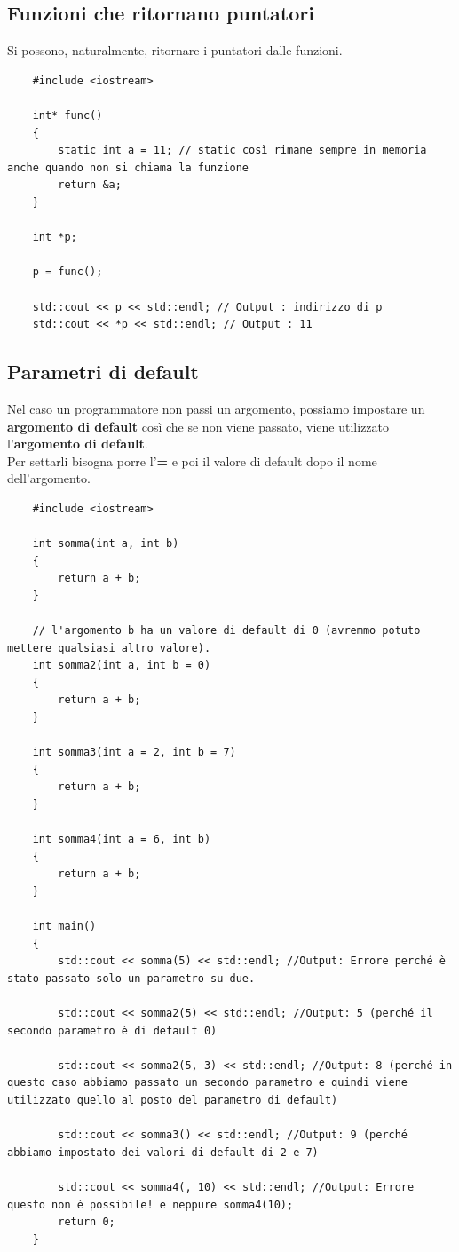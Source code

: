 \subsection{Funzioni che ritornano puntatori}

\textsf{\small Si possono, naturalmente, ritornare i puntatori dalle funzioni.}

\begin{lstlisting}
	#include <iostream>
	
	int* func()
	{
		static int a = 11; // static così rimane sempre in memoria anche quando non si chiama la funzione
		return &a;
	}

	int *p;
	
	p = func();
	
	std::cout << p << std::endl; // Output : indirizzo di p
	std::cout << *p << std::endl; // Output : 11
\end{lstlisting}


\subsection{Parametri di default}

\textsf{\small Nel caso un programmatore non passi un argomento, possiamo impostare un \textbf{argomento di default} così che se non viene passato, viene utilizzato l'\textbf{argomento di default}. } \\

\textsf{\small Per settarli bisogna porre l'\textbf{=} e poi il valore di default dopo il nome dell'argomento.} \\

\begin{lstlisting}
	#include <iostream>
	
	int somma(int a, int b)
	{
		return a + b;
	}

	// l'argomento b ha un valore di default di 0 (avremmo potuto mettere qualsiasi altro valore).
	int somma2(int a, int b = 0) 
	{
		return a + b;
	}

	int somma3(int a = 2, int b = 7)
	{
		return a + b;
	}

	int somma4(int a = 6, int b)
	{
		return a + b;
	}

	int main()
	{
		std::cout << somma(5) << std::endl; //Output: Errore perché è stato passato solo un parametro su due.
		
		std::cout << somma2(5) << std::endl; //Output: 5 (perché il secondo parametro è di default 0)
		
		std::cout << somma2(5, 3) << std::endl; //Output: 8 (perché in questo caso abbiamo passato un secondo parametro e quindi viene utilizzato quello al posto del parametro di default)
		
		std::cout << somma3() << std::endl; //Output: 9 (perché abbiamo impostato dei valori di default di 2 e 7)
		
		std::cout << somma4(, 10) << std::endl; //Output: Errore questo non è possibile! e neppure somma4(10);
		return 0;
	}
\end{lstlisting}

